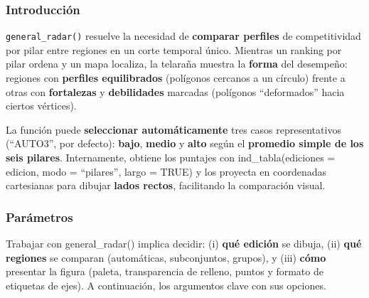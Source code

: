 \documentclass[
  11pt,
  letterpaper,
  DIV=11,
  numbers=noendperiod]{scrartcl}
\begin{document}
\subsubsection{\texorpdfstring{\textbf{Introducción}}{Introducción}}\label{introducciuxf3n-9}

\texttt{general\_radar()} resuelve la necesidad de \textbf{comparar
perfiles} de competitividad por pilar entre regiones en un corte
temporal único. Mientras un ranking por pilar ordena y un mapa localiza,
la telaraña muestra la \textbf{forma} del desempeño: regiones con
\textbf{perfiles equilibrados} (polígonos cercanos a un círculo) frente
a otras con \textbf{fortalezas} y \textbf{debilidades} marcadas
(polígonos ``deformados'' hacia ciertos vértices).

La función puede \textbf{seleccionar automáticamente} tres casos
representativos (``AUTO3'', por defecto): \textbf{bajo}, \textbf{medio}
y \textbf{alto} según el \textbf{promedio simple de los seis pilares}.
Internamente, obtiene los puntajes con ind\_tabla(ediciones = edicion,
modo = ``pilares'', largo = TRUE) y los proyecta en coordenadas
cartesianas para dibujar \textbf{lados rectos}, facilitando la
comparación visual.

\subsubsection{\texorpdfstring{\textbf{Parámetros}}{Parámetros}}\label{paruxe1metros-8}

Trabajar con general\_radar() implica decidir: (i) \textbf{qué edición}
se dibuja, (ii) \textbf{qué regiones} se comparan (automáticas,
subconjuntos, grupos), y (iii) \textbf{cómo} presentar la figura
(paleta, transparencia de relleno, puntos y formato de etiquetas de
ejes). A continuación, los argumentos clave con sus opciones.
\end{document}
